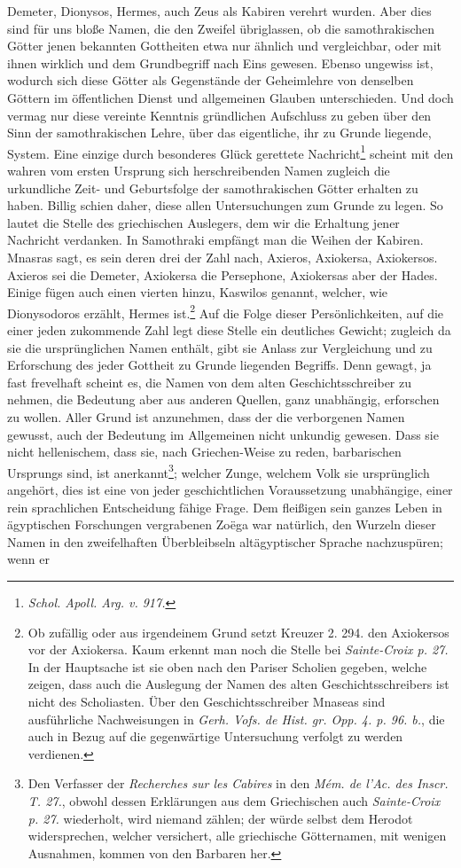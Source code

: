 \documentclass[a4paper, 11pt, oneside]{article}
\begin{document}
Demeter, Dionysos, Hermes, auch Zeus als Kabiren verehrt wurden. Aber dies sind für uns bloße Namen, die den Zweifel übriglassen, ob die samothrakischen Götter jenen bekannten Gottheiten etwa nur ähnlich und vergleichbar, oder mit ihnen wirklich und dem Grundbegriff nach Eins gewesen. Ebenso ungewiss ist, wodurch sich diese Götter als Gegenstände der Geheimlehre von denselben Göttern im öffentlichen Dienst und allgemeinen Glauben unterschieden. Und doch vermag nur diese vereinte Kenntnis gründlichen Aufschluss zu geben über den Sinn der samothrakischen Lehre, über das eigentliche, ihr zu Grunde liegende, System. Eine einzige durch besonderes Glück gerettete Nachricht\footnote{\emph{Schol. Apoll. Arg. v. 917.}} scheint mit den wahren vom ersten Ursprung sich herschreibenden Namen zugleich die urkundliche Zeit- und Geburtsfolge der samothrakischen Götter erhalten zu haben. Billig schien daher, diese allen Untersuchungen zum Grunde zu legen. So lautet die Stelle des griechischen Auslegers, dem wir die Erhaltung jener Nachricht verdanken. In Samothraki empfängt man die Weihen der Kabiren. Mnasras sagt, es sein deren drei der Zahl nach, Axieros, Axiokersa, Axiokersos. Axieros sei die Demeter, Axiokersa die Persephone, Axiokersas aber der Hades. Einige fügen auch einen vierten hinzu, Kaswilos genannt, welcher, wie Dionysodoros erzählt, Hermes ist.\footnote{Ob zufällig oder aus irgendeinem Grund setzt Kreuzer 2. 294. den Axiokersos vor der Axiokersa. Kaum erkennt man noch die Stelle bei \emph{Sainte-Croix p. 27.} In der Hauptsache ist sie oben nach den Pariser Scholien gegeben, welche zeigen, dass auch die Auslegung der Namen des alten Geschichtsschreibers ist nicht des Scholiasten. Über den Geschichtsschreiber Mnaseas sind ausführliche Nachweisungen in \emph{Gerh. Vofs. de Hist. gr. Opp. 4. p. 96. b.}, die auch in Bezug auf die gegenwärtige Untersuchung verfolgt zu werden verdienen.} Auf die Folge dieser Persönlichkeiten, auf die einer jeden zukommende Zahl legt diese Stelle ein deutliches Gewicht; zugleich da sie die ursprünglichen Namen enthält, gibt sie Anlass zur Vergleichung und zu Erforschung des jeder Gottheit zu Grunde liegenden Begriffs. Denn gewagt, ja fast frevelhaft scheint es, die Namen von dem alten Geschichtsschreiber zu nehmen, die Bedeutung aber aus anderen Quellen, ganz unabhängig, erforschen zu wollen. Aller Grund ist anzunehmen, dass der die verborgenen Namen gewusst, auch der Bedeutung im Allgemeinen nicht unkundig gewesen. Dass sie nicht hellenischem, dass sie, nach Griechen-Weise zu reden, barbarischen Ursprungs sind, ist anerkannt\footnote{Den Verfasser der \emph{Recherches sur les Cabires} in den \emph{Mém. de l'Ac. des Inscr. T. 27.}, obwohl dessen Erklärungen aus dem Griechischen auch \emph{Sainte-Croix p. 27.} wiederholt, wird niemand zählen; der würde selbst dem Herodot widersprechen, welcher versichert, alle griechische Götternamen, mit wenigen Ausnahmen, kommen von den Barbaren her.}; welcher Zunge, welchem Volk sie ursprünglich angehört, dies ist eine von jeder geschichtlichen Voraussetzung unabhängige, einer rein sprachlichen Entscheidung fähige Frage. Dem fleißigen sein ganzes Leben in ägyptischen Forschungen vergrabenen Zoëga war natürlich, den Wurzeln dieser Namen in den zweifelhaften Überbleibseln altägyptischer Sprache nachzuspüren; wenn er 
\end{document}
